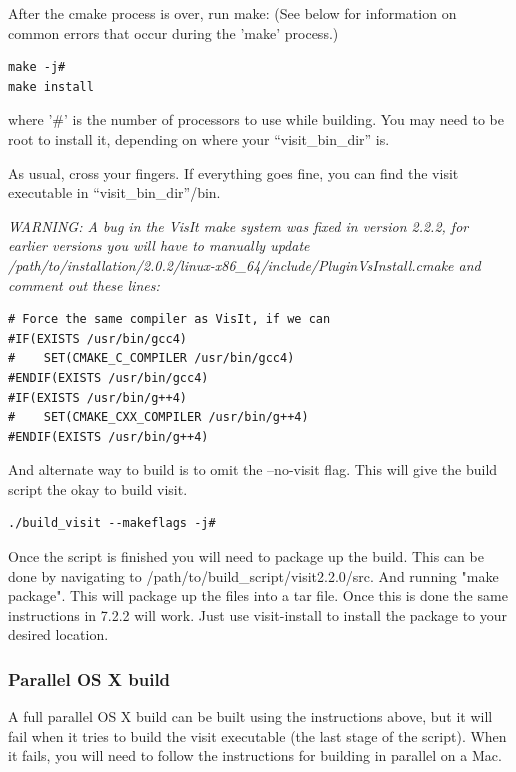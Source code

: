 \documentclass[12pt]{article}
\begin{document}
After the cmake process is over, run make:  (See below for
information on common errors that occur during the 'make' process.)

\begin{verbatim}
make -j#
make install
\end{verbatim}

where '\#' is the number of processors to use while building.  You
may need to be root to install it, depending on where your
``visit\_bin\_dir'' is.

As usual, cross your fingers. If everything goes fine, you can find
the visit executable in ``visit\_bin\_dir''/bin.

\emph{WARNING: A bug in the VisIt make system was fixed in version 2.2.2, 
for earlier versions you will have to manually update
/path/to/installation/2.0.2/linux-x86\_64/include/PluginVsInstall.cmake
and comment out these lines:}


\begin{verbatim}
# Force the same compiler as VisIt, if we can
#IF(EXISTS /usr/bin/gcc4)
#    SET(CMAKE_C_COMPILER /usr/bin/gcc4)
#ENDIF(EXISTS /usr/bin/gcc4)
#IF(EXISTS /usr/bin/g++4)
#    SET(CMAKE_CXX_COMPILER /usr/bin/g++4)
#ENDIF(EXISTS /usr/bin/g++4)
\end{verbatim}

And alternate way to build is to omit the --no-visit flag.  This will
give the build script the okay to build visit.

\begin{verbatim}
./build_visit --makeflags -j#
\end{verbatim}

Once the script is finished you will need to package up the build.  
This can be done by navigating to /path/to/build\_script/visit2.2.0/src.
And running "make package".  This will package up the files into a tar
file.  Once this is done the same instructions in 7.2.2 will work.  Just
use visit-install to install the package to your desired location.


\subsubsection{Parallel OS X build}
\label{sec:ParallelOSXBuild}

A full parallel OS X build can be built using the instructions above,
but it will fail when it tries to build the visit executable (the last
stage of the script). When it fails, you will need to follow the
instructions for building in parallel on a Mac.
\end{document}
